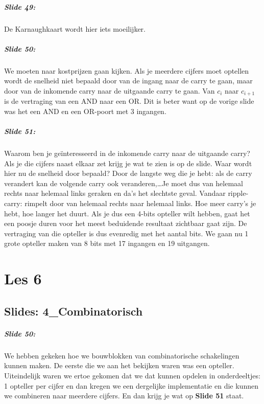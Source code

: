 \documentclass[10pt,a4paper]{book}
\begin{document}
\paragraph{Slide 49:} De Karnaughkaart wordt hier iets moeilijker.

\paragraph{Slide 50:} We moeten naar kostprijzen gaan kijken. Als je meerdere cijfers moet optellen wordt de snelheid niet bepaald door van de ingang naar de carry te gaan, maar door van de inkomende carry naar de uitgaande carry te gaan. Van $c_i$ naar $c_{i+1}$ is de vertraging van een AND naar een OR. Dit is beter want op de vorige slide was het een AND en een OR-poort met 3 ingangen.

\paragraph{Slide 51:} Waarom ben je ge\"interesseerd in de inkomende carry naar de uitgaande carry? Als je die cijfers naast elkaar zet krijg je wat te zien is op de slide. Waar wordt hier nu de snelheid door bepaald? Door de langste weg die je hebt: als de carry verandert kan de volgende carry ook veranderen,\ldots Je moet dus van helemaal rechts naar helemaal links geraken en da's het slechtste geval. Vandaar ripple-carry: rimpelt door van helemaal rechts naar helemaal links. Hoe meer carry's je hebt, hoe langer het duurt. Als je dus een 4-bits opteller wilt hebben, gaat het een poosje duren voor het meest beduidende resultaat zichtbaar gaat zijn. De vertraging van die opteller is dus evenredig met het aantal bits. We gaan nu 1 grote opteller maken van 8 bits met 17 ingangen en 19 uitgangen.

\chapter{Les 6}

\section{Slides: 4\_Combinatorisch}

\paragraph{Slide 50:} We hebben gekeken hoe we bouwblokken van combinatorische schakelingen kunnen maken. De eerste die we aan het bekijken waren was een opteller. Uiteindelijk waren we ertoe gekomen dat we dat kunnen opdelen in onderdeeltjes: 1 opteller per cijfer en dan kregen we een dergelijke implementatie en die kunnen we combineren naar meerdere cijfers. En dan krijg je wat op \textbf{Slide 51} staat.
\end{document}
